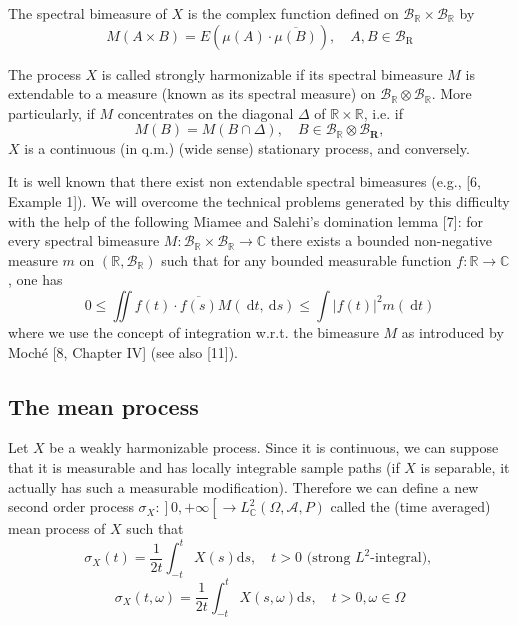 \documentclass{article}
\theoremstyle{definition}
\begin{document}
The spectral bimeasure of $X$ is the complex function defined on $\mathscr{B}_{\mathbb{R}} \times \mathscr{B}_{\mathbb{R}}$ by
\begin{equation}\label{eq:4}
M(A \times B)=E(\mu(A) \cdot \overline{\mu(B)}), \quad A, B \in \mathscr{B}_{\mathrm{R}}
\end{equation}

The process $X$ is called strongly harmonizable if its spectral bimeasure $M$ is extendable to a measure (known as its spectral measure) on $\mathscr{B}_{\mathbb{R}} \otimes \mathscr{B}_{\mathbb{R}}$. More particularly, if $M$ concentrates on the diagonal $\Delta$ of $\mathbb{R} \times \mathbb{R}$, i.e. if
\begin{equation}\label{eq:5}
M(B)=M(B \cap \Delta), \quad B \in \mathscr{B}_{\mathbb{R}} \otimes \mathscr{B}_{\mathbf{R}},
\end{equation}
$X$ is a continuous (in q.m.) (wide sense) stationary process, and conversely.

It is well known that there exist non extendable spectral bimeasures (e.g., [6, Example 1]). We will overcome the technical problems generated by this difficulty with the help of the following Miamee and Salehi's domination lemma [7]: for every spectral bimeasure $M: \mathscr{B}_{\mathbb{R}} \times \mathscr{B}_{\mathbb{R}} \rightarrow \mathbb{C}$ there exists a bounded non-negative measure $m$ on $(\mathbb{R}, \mathscr{B}_{\mathbb{R}})$ such that for any bounded measurable function $f: \mathbb{R} \rightarrow \mathbb{C}$, one has
\begin{equation}\label{eq:6}
0 \leqslant \iint f(t) \cdot \overline{f(s)} M(\mathrm{~d} t, \mathrm{~d} s) \leqslant \int|f(t)|^{2} m(\mathrm{~d} t)
\end{equation}
where we use the concept of integration w.r.t. the bimeasure $M$ as introduced by Moché [8, Chapter IV] (see also [11]).

\subsection{The mean process}

Let $X$ be a weakly harmonizable process. Since it is continuous, we can suppose that it is measurable and has locally integrable sample paths (if $X$ is separable, it actually has such a measurable modification). Therefore we can define a new second order process $\left.\sigma_{X}:\right] 0,+\infty\left[\rightarrow L_{\mathbb{C}}^{2}(\Omega, \mathscr{A}, P)\right.$ called the (time averaged) mean process of $X$ such that
\begin{equation}\label{eq:7}
\sigma_{X}(t)=\frac{1}{2 t} \int_{-t}^{t} X(s) \mathrm{d} s, \quad t>0 \text{ (strong } L^{2} \text{-integral), }
\end{equation}
\begin{equation}\label{eq:8}
\sigma_{X}(t, \omega)=\frac{1}{2 t} \int_{-t}^{t} X(s, \omega) \mathrm{d} s, \quad t>0, \omega \in \Omega
\end{equation}
\end{document}

